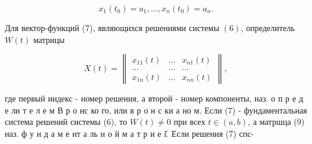 \documentclass[10pt]{article}
\begin{document}
\[

x_{1}\left(t_{0}\right)=a_{1}, \ldots, x_{n}\left(t_{0}\right)=a_{n} .

\]



Для вектор-функций (7), являющихся решениями системы $(6)$, определитель $W(t)$ матрицы



\[

X(t)=\left\|\begin{array}{ccc}

x_{11}(t) & \ldots & x_{n 1}(t) \\

\ldots & \ldots & \ldots \\

x_{1 n}(t) & \ldots & x_{n n}(t)

\end{array}\right\|,

\]



где первый индекс - номер решения, а второй - номер компоненты, наз. о п р е д е ли т е л е м В р о нс ко го, или в р о н с ки а но м. Если (7) - фундаментальная система решений системы (6), то $W(t) \neq 0$ при всех $t \in(a, b)$, а матршца (9) наз. ф у н д а м е нт а ль н о й м а т р и е і̆. Если решения (7) спс-
\end{document}
